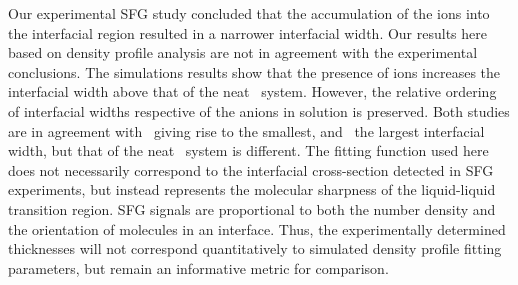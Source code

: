 Our experimental SFG study concluded that the accumulation of the ions into the interfacial region resulted in a narrower interfacial width.\cite{McFearin2009} Our results here based on density profile analysis are not in agreement with the experimental conclusions. The simulations results show that the presence of ions increases the interfacial width above that of the neat \ctcwat~system. However, the relative ordering of interfacial widths respective of the anions in solution is preserved. Both studies are in agreement with \nit~giving rise to the smallest, and \sul~the largest interfacial width, but that of the neat \ctcwat~system is different. The fitting function used here does not necessarily correspond to the interfacial cross-section detected in SFG experiments, but instead represents the molecular sharpness of the liquid-liquid transition region. SFG signals are proportional to both the number density and the orientation of molecules in an interface. Thus, the experimentally determined thicknesses will not correspond quantitatively to simulated density profile fitting parameters, but remain an informative metric for comparison.

